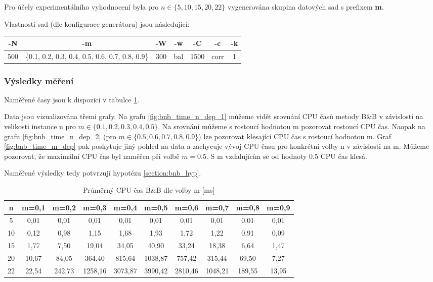 \documentclass[12pt]{article}
\begin{document}
Pro účely experimentálního vyhodnocení byla pro $n \in \{5, 10, 15, 20, 22\}$ vygenerována skupina datových sad s prefixem \textbf{m}.

Vlastnosti sad (dle konfigurace generátoru) jsou následující:

\begin{center}
    \begin{tabular}{|c | c | c | c | c | c | c|} 
        \hline
        -N & -m & -W & -w & -C & -c & -k \\ [0.1ex]
        \hline\hline
        500 & \{0.1, 0.2, 0.3, 0.4, 0.5, 0.6, 0.7, 0.8, 0.9\} & 300 & bal & 1500 & corr & 1\\
        \hline
    \end{tabular}
\end{center}

\subsubsection*{Výsledky měření}

Naměřené časy jsou k dispozici v tabulce \ref{tab:bnb_time_n_dep}.

Data jsou vizualizována třemi grafy. Na grafu \ref{fig:bnb_time_n_dep_1} můžeme vidět srovnání CPU časů metody B\&B v závislosti na velikosti instance n pro $m \in \{0.1, 0.2, 0.3, 0.4, 0.5\}$. Na srovnání můžeme s rostoucí hodnotou m pozorovat rostoucí CPU čas. Naopak na grafu \ref{fig:bnb_time_n_dep_2} (pro $m \in \{0.5, 0.6, 0.7, 0.8, 0.9\}$) lze pozorovat klesající CPU čas s rostoucí hodnotou m. Graf \ref{fig:bnb_time_m_dep} pak poskytuje jiný pohled na data a zachycuje vývoj CPU času pro konkrétní volby n v závislosti na m. Můžeme pozorovat, že maximální CPU čas byl naměřen při volbě $m=0.5$. S m vzdalujícím se od hodnoty $0.5$ CPU čas klesá.

Naměřené výsledky tedy potvrzují hypotézu \ref{section:bnb_hyp}.

\begin{table}
    \begin{center}
         \begin{tabular}{|c | c | c | c | c | c | c | c | c | c|} 
         \hline
         n & m=0,1 & m=0,2 & m=0,3 & m=0,4 & m=0,5 & m=0,6 & m=0,7 & m=0,8 & m=0,9 \\ [0.1ex] 
         \hline\hline
        5 & 0,01 & 0,01 & 0,01 & 0,01 & 0,01 & 0,01 & 0,01 & 0,01 & 0,01 \\
        \hline
        10 & 0,12 & 0,98 & 1,15 & 1,68 & 1,93 & 1,72 & 1,22 & 0,91 & 0,09 \\
        \hline
        15 & 1,77 & 7,50 & 19,04 & 34,05 & 40,90 & 33,24 & 18,38 & 6,64 & 1,47 \\
        \hline
        20 & 10,67 & 84,05 & 364,40 & 815,64 & 1038,87 & 757,42 & 315,44 & 69,50 & 7,27 \\
        \hline
        22 & 22,54 & 242,73 & 1258,16 & 3073,87 & 3990,42 & 2810,46 & 1048,21 & 189,55 & 13,95 \\
        \hline
        \end{tabular}
        \caption{Průměrný CPU čas B\&B dle volby m [ms]}
        \label{tab:bnb_time_n_dep}
    \end{center}
\end{table}
\end{document}
